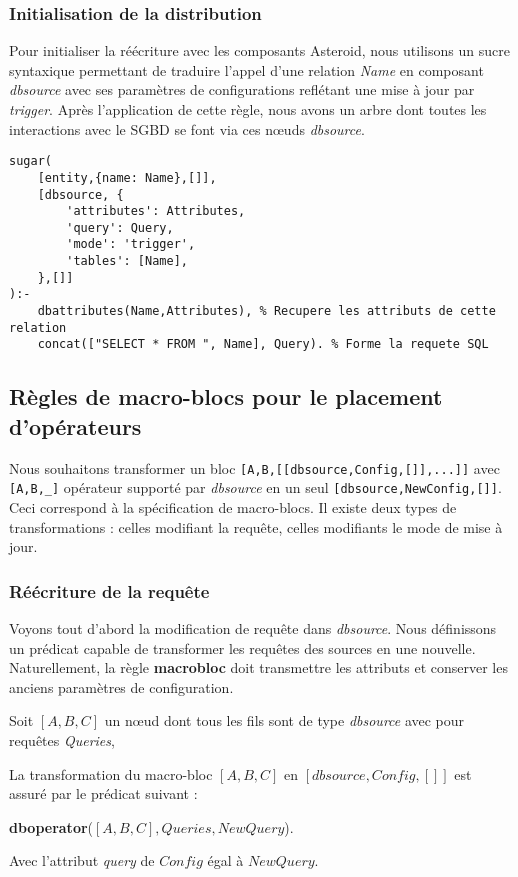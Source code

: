 \subsubsection{Initialisation de la distribution}
Pour initialiser la réécriture avec les composants Asteroid, nous utilisons un sucre syntaxique permettant de traduire l'appel d'une relation \textit{Name} en composant \textit{dbsource} avec ses paramètres de configurations reflétant une mise à jour par \textit{trigger}. Après l'application de cette règle, nous avons un arbre dont toutes les interactions avec le SGBD se font via ces nœuds \textit{dbsource}.
\begin{lstlisting}
sugar(
    [entity,{name: Name},[]],
    [dbsource, {
        'attributes': Attributes,
        'query': Query,
        'mode': 'trigger', 
        'tables': [Name],
    },[]]
):-
    dbattributes(Name,Attributes), % Recupere les attributs de cette relation
    concat(["SELECT * FROM ", Name], Query). % Forme la requete SQL
\end{lstlisting}

\subsection{Règles de macro-blocs pour le placement d'opérateurs}
Nous souhaitons transformer un bloc \lstinline|[A,B,[[dbsource,Config,[]],...]]| avec \lstinline|[A,B,_]| opérateur supporté par \textit{dbsource} en un seul \lstinline|[dbsource,NewConfig,[]]|. Ceci correspond à la spécification de macro-blocs. Il existe deux types de transformations : celles modifiant la requête, celles modifiants le mode de mise à jour.

\subsubsection{Réécriture de la requête}
Voyons tout d'abord la modification de requête dans \textit{dbsource}. Nous définissons un prédicat capable de transformer les requêtes des sources en une nouvelle. Naturellement, la règle \textbf{macrobloc} doit transmettre les attributs et conserver les anciens paramètres de configuration.
\begin{regle}
    Soit $[A,B,C]$ un nœud dont tous les fils sont de type \textit{dbsource} avec pour requêtes \textit{Queries},

    La transformation du macro-bloc $[A,B,C]$ en $[dbsource,Config,[]]$ est assuré par le prédicat suivant :
    \begin{center} \textbf{dboperator}($[A,B,C], Queries, NewQuery$). \end{center}
    Avec l'attribut \textit{query} de $Config$ égal à $NewQuery$.
\end{regle}

